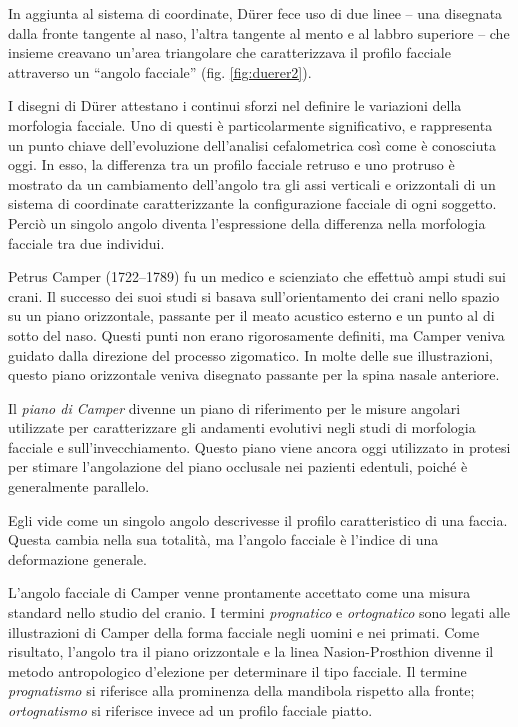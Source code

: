 In aggiunta al sistema di coordinate, Dürer fece uso di due linee -- una disegnata dalla fronte tangente al naso, l'altra tangente al mento e al labbro superiore -- che insieme creavano un'area triangolare che caratterizzava il profilo facciale attraverso un ``angolo facciale'' (fig. \vref{fig:duerer2}).

I disegni di Dürer attestano i continui sforzi nel definire le variazioni della morfologia facciale. Uno di questi è particolarmente significativo, e rappresenta un punto chiave dell'evoluzione dell'analisi cefalometrica così come è conosciuta oggi. In esso, la differenza tra un profilo facciale retruso e uno protruso è mostrato da un cambiamento dell'angolo tra gli assi verticali e orizzontali di un sistema di coordinate caratterizzante la configurazione facciale di ogni soggetto. Perciò un singolo angolo diventa l'espressione della differenza nella morfologia facciale tra due individui.


Petrus Camper (1722--1789) fu un medico e scienziato che effettuò ampi studi sui crani. Il successo dei suoi studi si basava sull'orientamento dei crani nello spazio su un piano orizzontale, passante per il meato acustico esterno e un punto al di sotto del naso. Questi punti non erano rigorosamente definiti, ma Camper veniva guidato dalla direzione del processo zigomatico. In molte delle sue illustrazioni, questo piano orizzontale veniva disegnato passante per la spina nasale anteriore.

Il \textit{piano di Camper} divenne un piano di riferimento per le misure angolari utilizzate per caratterizzare gli andamenti evolutivi negli studi di morfologia facciale e sull'invecchiamento. Questo piano viene ancora oggi utilizzato in protesi per stimare l'angolazione del piano occlusale nei pazienti edentuli, poiché è generalmente parallelo.

Egli vide come un singolo angolo descrivesse il profilo caratteristico di una faccia. Questa cambia nella sua totalità, ma l'angolo facciale è l'indice di una deformazione generale.

L'angolo facciale di Camper venne prontamente accettato come una misura standard nello studio del cranio. I termini \textit{prognatico} e \textit{ortognatico} sono legati alle illustrazioni di Camper della forma facciale negli uomini e nei primati. Come risultato, l'angolo tra il piano orizzontale e la linea Nasion-Prosthion divenne il metodo antropologico d'elezione per determinare il tipo facciale. Il termine \textit{prognatismo} si riferisce alla prominenza della mandibola rispetto alla fronte; \textit{ortognatismo} si riferisce invece ad  un profilo facciale piatto.

